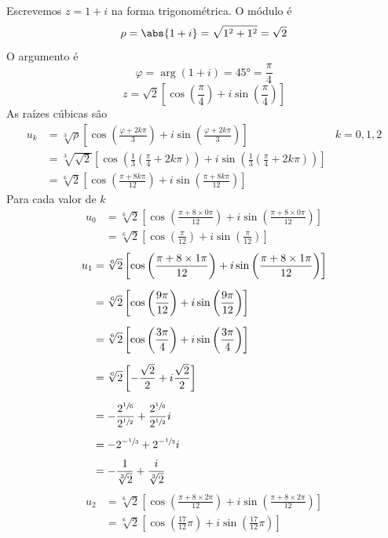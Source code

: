 \documentclass[a4paper,12pt,fleqn]{article}
\begin{document}
\begin{answer}
  Escrevemos \(z = 1 + i\) na forma trigonométrica. O módulo é
  \[
    \rho = \abs{1+i} = \sqrt{1^2 + 1^2} = \sqrt{2}
  \]
  O argumento é
  \[
    \varphi = \arg(1+i) = \ang{45} = \frac{\pi}{4}
  \]
  \[
    z = \sqrt{2} \left[ \cos\left(\frac{\pi}{4}\right) + i \sin\left(\frac{\pi}{4}\right) \right]
  \]
  As raízes cúbicas são
  \begin{align*}
    u_k
    & = \sqrt[3]{\rho} \left[
        \cos\left(\frac{\varphi + 2k\pi}{3}\right)
        + i \sin\left(\frac{\varphi + 2k\pi}{3}\right)
    \right]
    & k = 0, 1, 2    \\[2mm]
    & = \sqrt[3]{\sqrt{2}} \left[
        \cos\left(\frac{1}{3}\left(\frac{\pi}{4} + 2k\pi\right)\right)
        + i \sin\left(\frac{1}{3}\left(\frac{\pi}{4} + 2k\pi\right)\right)
        \right] \\[2mm]
    & = \sqrt[6]{2} \left[
        \cos\left( \frac{\pi + 8k\pi}{12} \right)
        + i \sin\left( \frac{\pi + 8k\pi}{12} \right)
        \right]
  \end{align*}
  Para cada valor de $k$
  \begin{align*}
    u_0
    & = \sqrt[6]{2} \left[
        \cos\left( \frac{\pi + 8\times0\pi}{12} \right)
        + i \sin\left( \frac{\pi + 8\times0\pi}{12} \right)
        \right] \\[2mm]
    & = \sqrt[6]{2} \left[
        \cos\left( \frac{\pi}{12} \right)
        + i \sin\left( \frac{\pi}{12} \right)
        \right]
  \end{align*}
  \begin{align*}
    u_1
    & = \sqrt[6]{2} \left[
        \cos\left( \frac{\pi + 8\times1\pi}{12} \right)
        + i \sin\left( \frac{\pi + 8\times1\pi}{12} \right)
        \right] \\[2mm]
    & = \sqrt[6]{2} \left[
        \cos\left( \frac{9\pi}{12} \right)
        + i \sin\left( \frac{9\pi}{12} \right)
        \right] \\[2mm]
    & = \sqrt[6]{2} \left[
        \cos\left( \frac{3\pi}{4} \right)
        + i \sin\left( \frac{3\pi}{4} \right)
        \right] \\[2mm]
    & = \sqrt[6]{2} \left[
        - \frac{\sqrt{2}}{2}
        + i \frac{\sqrt{2}}{2}
        \right] \\[2mm]
    & = - \frac{2^{\sfrac{1}{6}}}{2^{\sfrac{1}{2}}}
        + \frac{2^{\sfrac{1}{6}}}{2^{\sfrac{1}{2}}} i  \\[2mm]
    & = - 2^{-\sfrac{1}{3}}
        + 2^{-\sfrac{1}{3}} i \\[2mm]
    & = - \frac{1}{\sqrt[3]{2}}
        + \frac{i}{\sqrt[3]{2}}
  \end{align*}
  \begin{align*}
    u_2
    & = \sqrt[6]{2} \left[
        \cos\left( \frac{\pi + 8\times2\pi}{12} \right)
        + i \sin\left( \frac{\pi + 8\times2\pi}{12} \right)
        \right] \\[2mm]
    & = \sqrt[6]{2} \left[
        \cos\left( \frac{17}{12}\pi \right)
        + i \sin\left( \frac{17}{12}\pi \right)
        \right]
  \end{align*}
\end{answer}

\end{document}
